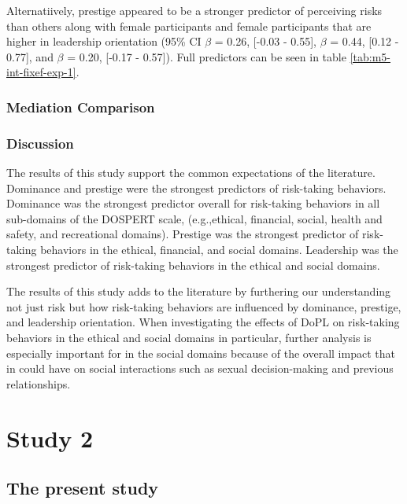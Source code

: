 \documentclass[
  donotrepeattitle,doc, 12pt, a4paper,floatsintext]{apa7}
\begin{document}
Alternatiively, prestige appeared to be a stronger predictor of perceiving risks than others along with female participants and female participants that are higher in leadership orientation (95\% CI \(\beta\) = 0.26, {[}-0.03 - 0.55{]}, \(\beta\) = 0.44, {[}0.12 - 0.77{]}, and \(\beta\) = 0.20, {[}-0.17 - 0.57{]}). Full predictors can be seen in table \ref{tab:m5-int-fixef-exp-1}.

\hypertarget{mediation-comparison}{%
\subsubsection{Mediation Comparison}\label{mediation-comparison}}

\hypertarget{discussion}{%
\subsubsection{Discussion}\label{discussion}}

The results of this study support the common expectations of the literature. Dominance and prestige were the strongest predictors of risk-taking behaviors. Dominance was the strongest predictor overall for risk-taking behaviors in all sub-domains of the DOSPERT scale, (e.g.,ethical, financial, social, health and safety, and recreational domains). Prestige was the strongest predictor of risk-taking behaviors in the ethical, financial, and social domains. Leadership was the strongest predictor of risk-taking behaviors in the ethical and social domains.

The results of this study adds to the literature by furthering our understanding not just risk but how risk-taking behaviors are influenced by dominance, prestige, and leadership orientation. When investigating the effects of DoPL on risk-taking behaviors in the ethical and social domains in particular, further analysis is especially important for in the social domains because of the overall impact that in could have on social interactions such as sexual decision-making and previous relationships.

\newpage

\hypertarget{study-2}{%
\section{Study 2}\label{study-2}}

\hypertarget{the-present-study-1}{%
\subsection{The present study}\label{the-present-study-1}}
\end{document}
